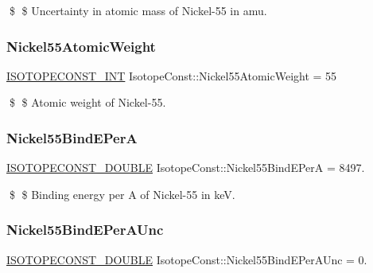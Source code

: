 \$ \$ Uncertainty in atomic mass of Nickel-\/55 in amu. \mbox{\label{group___isotope_const-_nickel-_ni55_ga167ab029dcebf7ed9bd945f31c8d63fe}} 
\subsubsection{\texorpdfstring{Nickel55\+Atomic\+Weight}{Nickel55AtomicWeight}}
{\footnotesize\ttfamily \mbox{\hyperlink{group___isotope_const-_macros_ga5f18360b3e99483a35c32d789e62621c}{I\+S\+O\+T\+O\+P\+E\+C\+O\+N\+S\+T\+\_\+\+I\+NT}} Isotope\+Const\+::\+Nickel55\+Atomic\+Weight = 55}

\$ \$ Atomic weight of Nickel-\/55. \mbox{\label{group___isotope_const-_nickel-_ni55_ga297bb0456c5d37ccb647472498a3fe6e}} 
\subsubsection{\texorpdfstring{Nickel55\+Bind\+E\+PerA}{Nickel55BindEPerA}}
{\footnotesize\ttfamily \mbox{\hyperlink{group___isotope_const-_macros_ga8f45a7272ce02c0b4c65c44636ed719a}{I\+S\+O\+T\+O\+P\+E\+C\+O\+N\+S\+T\+\_\+\+D\+O\+U\+B\+LE}} Isotope\+Const\+::\+Nickel55\+Bind\+E\+PerA = 8497.}

\$ \$ Binding energy per A of Nickel-\/55 in keV. \mbox{\label{group___isotope_const-_nickel-_ni55_ga8ef89a48d8b1e1b78a0f7d5989130a3c}} 
\subsubsection{\texorpdfstring{Nickel55\+Bind\+E\+Per\+A\+Unc}{Nickel55BindEPerAUnc}}
{\footnotesize\ttfamily \mbox{\hyperlink{group___isotope_const-_macros_ga8f45a7272ce02c0b4c65c44636ed719a}{I\+S\+O\+T\+O\+P\+E\+C\+O\+N\+S\+T\+\_\+\+D\+O\+U\+B\+LE}} Isotope\+Const\+::\+Nickel55\+Bind\+E\+Per\+A\+Unc = 0.}

